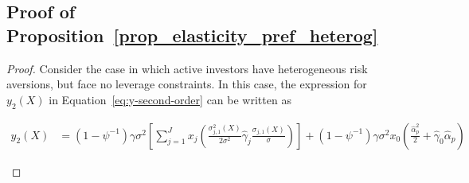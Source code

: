\subsection{Proof of Proposition~\ref{prop_elasticity_pref_heterog}}\label{app:prop_elasticity_pref_heterog}
\begin{proof}
	Consider the case in which active investors have heterogeneous risk aversions, but face no leverage constraints. In this case, the expression for $y_{2}(X)$ in Equation~\eqref{eq:y-second-order} can be written as
	\begin{small}
	\begin{align}
            y_2(X) &=  \left(1-\psi^{-1}\right) \gamma \sigma^2 \left[  \sum_{j=1}^J x_{j}\left( \frac{\sigma_{j,1}^2(X)}{2 \sigma^2} \hat{\gamma}_j\frac{ \sigma_{j,1}(X)}{\sigma}  \right)\right] + \left(1-\psi^{-1}\right) \gamma \sigma^2 x_0 \left(\frac{\hat{\alpha}_p^2}{2} + \hat{\gamma}_0 \hat{\alpha}_p  \right)
		\end{align}
	\end{small}
	

\end{proof}
